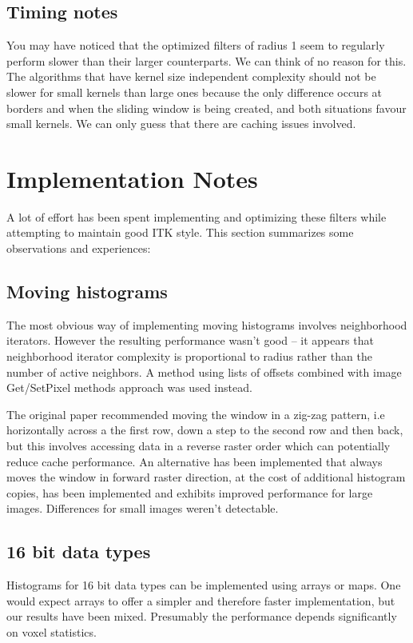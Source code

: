 \documentclass{InsightArticle}
\begin{document}
\subsection{Timing notes}
You may have noticed that the optimized filters of radius 1 seem to
regularly perform slower than their larger counterparts. We can think
of no reason for this. The algorithms that have kernel size
independent complexity should not be slower for small kernels than
large ones because the only difference occurs at borders and when the
sliding window is being created, and both situations favour small
kernels. We can only guess that there are caching issues involved.

\section{Implementation Notes}
A lot of effort has been spent implementing and optimizing these filters 
while attempting to maintain good ITK style. This section summarizes some observations
and experiences:
\subsection{Moving histograms}
The most obvious way of implementing moving histograms involves
neighborhood iterators.  However the resulting performance wasn't good
-- it appears that neighborhood iterator complexity is proportional to
radius rather than the number of active neighbors. A method using
lists of offsets combined with image Get/SetPixel methods approach was
used instead.

The original paper recommended moving the window in a zig-zag pattern, i.e horizontally 
across a the first row, down a step to the second row and then back, but this involves
accessing data in a reverse raster order which can potentially reduce cache performance.
An alternative has been implemented that always moves the window in forward raster direction,
at the cost of additional histogram copies, has been implemented and exhibits improved
performance for large images. Differences for small images weren't detectable.

\subsection{16 bit data types}
Histograms for 16 bit data types can be implemented using arrays or maps. One would
expect arrays to offer a simpler and therefore faster implementation, but our results
have been mixed. Presumably the performance depends significantly on voxel statistics.
\end{document}
